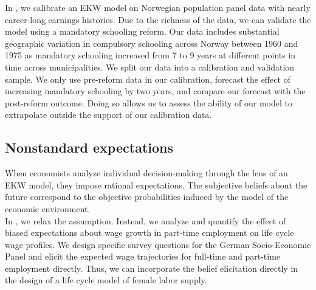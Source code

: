 \noindent In \citet{Bhuller.2018}, we calibrate an EKW model on Norwegian population panel data with nearly career-long earnings histories. Due to the richness of the data, we can validate the model using a mandatory schooling reform. Our data includes substantial geographic variation in compulsory schooling across Norway between 1960 and 1975 as mandatory schooling increased from 7 to 9 years at different points in time across municipalities. We split our data into a calibration and validation sample. We only use pre-reform data in our calibration, forecast the effect of increasing mandatory schooling by two years, and compare our forecast with the post-reform outcome. Doing so allows us to assess the ability of our model to extrapolate outside the support of our calibration data.
\subsection{Nonstandard expectations}
When economists analyze individual decision-making through the lens of an EKW model, they impose rational expectations. The subjective beliefs about the future correspond to the objective probabilities induced by the model of the economic environment.\\

\noindent In \citet{Eisenhauer.2020a}, we relax the assumption. Instead, we analyze and quantify the effect of biased expectations about wage growth in part-time employment on life cycle wage profiles. We design specific survey questions for the German Socio-Economic Panel \citep{DIW.2005} and elicit the expected wage trajectories for full-time and part-time employment directly. Thus, we can incorporate the belief elicitation directly in the design of a life cycle model of female labor supply.
